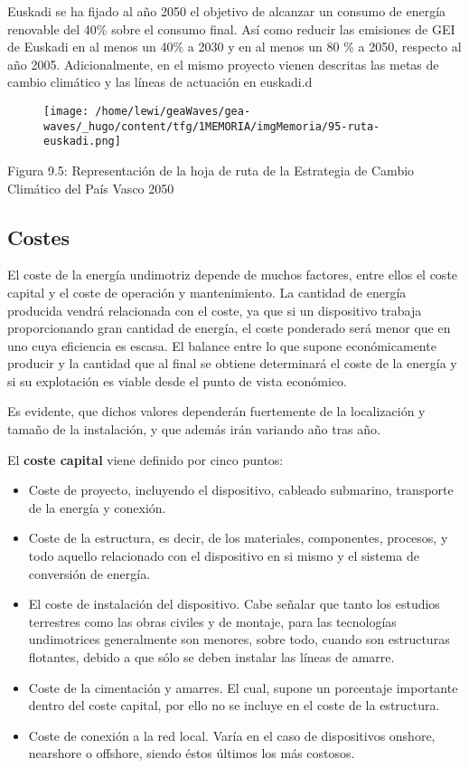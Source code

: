 Euskadi se ha fijado al año 2050 el objetivo de alcanzar un consumo de
energía renovable del 40\% sobre el consumo final. Así como reducir las
emisiones de GEI de Euskadi en al menos un 40\% a 2030 y en al menos un
80 \% a 2050, respecto al año 2005. Adicionalmente, en el mismo proyecto
vienen descritas las metas de cambio climático y las líneas de actuación
en euskadi.d

\begin{figure}
\centering
\texttt{[image: /home/lewi/geaWaves/gea-waves/\_hugo/content/tfg/1MEMORIA/imgMemoria/95-ruta-euskadi.png]}
\caption{}
\end{figure}

Figura 9.5: Representación de la hoja de ruta de la Estrategia de Cambio
Climático del País Vasco 2050

\subsection{Costes}\label{header-n204}

El coste de la energía undimotriz depende de muchos factores, entre
ellos el coste capital y el coste de operación y mantenimiento. La
cantidad de energía producida vendrá relacionada con el coste, ya que si
un dispositivo trabaja proporcionando gran cantidad de energía, el coste
ponderado será menor que en uno cuya eficiencia es escasa. El balance
entre lo que supone económicamente producir y la cantidad que al final
se obtiene determinará el coste de la energía y si su explotación es
viable desde el punto de vista económico.

Es evidente, que dichos valores dependerán fuertemente de la
localización y tamaño de la instalación, y que además irán variando año
tras año.

El \textbf{coste capital} viene definido por cinco puntos:

\begin{itemize}
\item
  Coste de proyecto, incluyendo el dispositivo, cableado submarino,
  transporte de la energía y conexión. 
\item
  Coste de la estructura, es decir, de los materiales, componentes,
  procesos, y todo aquello relacionado con el dispositivo en si mismo y
  el sistema de conversión de energía. 
\item
  El coste de instalación del dispositivo. Cabe señalar que tanto los
  estudios terrestres como las obras civiles y de montaje, para las
  tecnologías undimotrices generalmente son menores, sobre todo, cuando
  son estructuras flotantes, debido a que sólo se deben instalar las
  líneas de amarre. 
\item
  Coste de la cimentación y amarres. El cual, supone un porcentaje
  importante dentro del coste capital, por ello no se incluye en el
  coste de la estructura. 
\item
  Coste de conexión a la red local. Varía en el caso de dispositivos
  onshore, nearshore o offshore, siendo éstos últimos los más costosos. 
\end{itemize}

